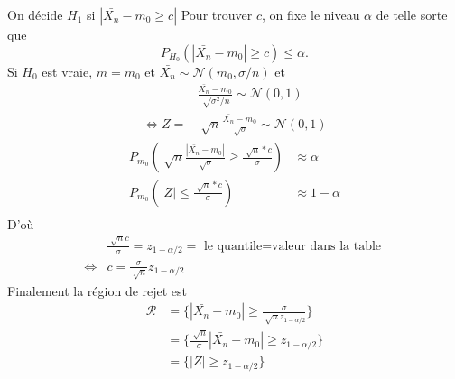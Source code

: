 \documentclass{article}
\theoremstyle{plain}%
\theoremstyle{definition}
\theoremstyle{remark}
\begin{document}
On décide $ H_1 $ si $ \left| \bar{X_n} - m_0 \geq c \right|  $ 
Pour trouver $ c $, on fixe le niveau $ \alpha  $ de telle sorte que 
\[
    P_{H_0} ( \left| \bar{X_n}-m_0 \right| \geq c) \leq \alpha 
.\]
Si $ H_0 $ est vraie, $ m=m_0 $ et $ \bar{X_n} \sim \mathcal{N}(m_0, \sigma/n) $ et
\begin{align*}
        &\frac{\bar{X_n} - m_0}{\sqrt[]{\sigma ^2 /n}} \sim \mathcal{N}(0,1) \\
    \Leftrightarrow Z= & \sqrt[]{n}\frac{\bar{X_n} - m_0}{\sqrt[]{\sigma}} \sim \mathcal{N}(0,1)
\end{align*}
\begin{align*}
    P_{m_0} ( \sqrt[]{n}\frac{\left| \bar{X_n} - m_0 \right|}{\sqrt[]{\sigma}} \geq  \frac{\sqrt[]{n}*c}{\sigma }) &\approx \alpha \\
    P_{m_0} ( \left| Z \right|  \leq  \frac{\sqrt[]{n}*c}{\sigma }) &\approx 1 - \alpha \\
\end{align*}
D'où \begin{align*}
        &\frac{\sqrt[]{n}c}{\sigma } = z_{1 - \alpha /2} = \text{ le quantile=valeur dans la table } \\
    \Leftrightarrow & c = \frac{\sigma }{\sqrt[]{n}} z_{1 - \alpha /2}
\end{align*}
Finalement la région de rejet est 
\begin{align*}
    \mathcal{R} &= \{\left| \bar{X_n}- m_0 \right| \geq  \frac{\sigma }{\sqrt[]{n}z_{1 - \alpha /2}}\} \\
    &= \{\frac{\sqrt[]{n}}{\sigma} \left| \bar{X_n}- m_0 \right| \geq  z_{1 - \alpha /2}\} \\
    &= \{\left| Z \right| \geq z_{1 - \alpha /2}\}
\end{align*}
\end{document}
